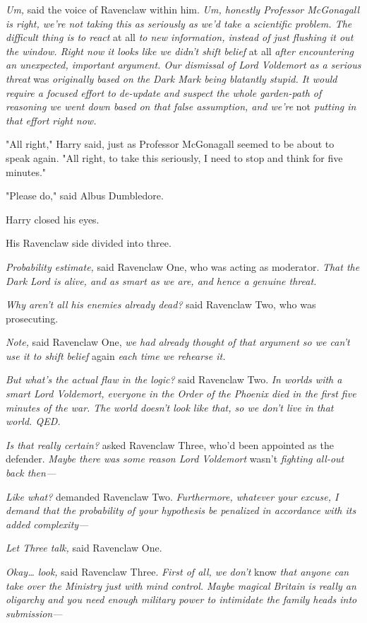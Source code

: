 \emph{Um,} said the voice of Ravenclaw within him. \emph{Um, honestly Professor McGonagall is right, we're not taking this as seriously as we'd take a scientific problem. The difficult thing is to react} at all\emph{ to new information, instead of just flushing it out the window. Right now it looks like we didn't shift belief} at all\emph{ after encountering an unexpected, important argument. Our dismissal of Lord Voldemort as a serious threat} was\emph{ originally based on the Dark Mark being blatantly stupid. It would require a focused effort to de-update and suspect the whole garden-path of reasoning we went down based on that false assumption, and we're} not\emph{ putting in that effort right now.}

"All right," Harry said, just as Professor McGonagall seemed to be about to speak again. "All right, to take this seriously, I need to stop and think for five minutes."

"Please do," said Albus Dumbledore.

Harry closed his eyes.

His Ravenclaw side divided into three.

\emph{Probability estimate,} said Ravenclaw One, who was acting as moderator. \emph{That the Dark Lord is alive, and as smart as we are, and hence a genuine threat.}

\emph{Why aren't all his enemies already dead?} said Ravenclaw Two, who was prosecuting.

\emph{Note,} said Ravenclaw One, \emph{we had already thought of that argument so we can't use it to shift belief} again\emph{ each time we rehearse it.}

\emph{But what's the actual flaw in the logic?} said Ravenclaw Two. \emph{In worlds with a smart Lord Voldemort, everyone in the Order of the Phoenix died in the first five minutes of the war. The world doesn't look like that, so we don't live in that world. QED.}

\emph{Is that really certain?} asked Ravenclaw Three, who'd been appointed as the defender. \emph{Maybe there was some reason Lord Voldemort} wasn't \emph{fighting all-out back then---}

\emph{Like what?} demanded Ravenclaw Two. \emph{Furthermore, whatever your excuse, I demand that the probability of your hypothesis be penalized in accordance with its added complexity---}

\emph{Let Three talk,} said Ravenclaw One.

\emph{Okay{\ldots} look,} said Ravenclaw Three. \emph{First of all, we don't} know\emph{ that anyone can take over the Ministry just with mind control. Maybe magical Britain is really an oligarchy and you need enough military power to intimidate the family heads into submission---}

